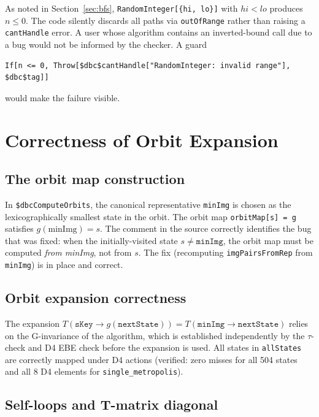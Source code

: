 \documentclass[12pt,a4paper]{article}
\theoremstyle{critical}
\theoremstyle{remark}
\theoremstyle{verified}
\begin{document}
As noted in Section~\ref{sec:bfs}, \texttt{RandomInteger[\{hi, lo\}]} with
$hi < lo$ produces $n \leq 0$.  The code silently discards all paths via
\texttt{outOfRange} rather than raising a \texttt{cantHandle} error.  A user
whose algorithm contains an inverted-bound call due to a bug would not be informed
by the checker.  A guard
\begin{lstlisting}
If[n <= 0, Throw[$dbc$cantHandle["RandomInteger: invalid range"], $dbc$tag]]
\end{lstlisting}
would make the failure visible.

\section{Correctness of Orbit Expansion}
\label{sec:orbits}

\subsection{The orbit map construction}

In \texttt{\$dbcComputeOrbits}, the canonical representative \texttt{minImg} is
chosen as the lexicographically smallest state in the orbit.  The orbit map
\texttt{orbitMap[s] = g} satisfies $g(\text{minImg}) = s$.  The comment in the
source correctly identifies the bug that was fixed: when the initially-visited
state $s \neq \texttt{minImg}$, the orbit map must be computed \emph{from
minImg}, not from $s$.  The fix (recomputing \texttt{imgPairsFromRep} from
\texttt{minImg}) is in place and correct.

\subsection{Orbit expansion correctness}

The expansion $T(\texttt{sKey} \to g(\texttt{nextState})) = T(\texttt{minImg} \to \texttt{nextState})$ relies on
the G-invariance of the algorithm, which is established independently by the
$\tau$-check and D4 EBE check before the expansion is used.  All states in
\texttt{allStates} are correctly mapped under D4 actions (verified: zero misses
for all 504 states and all 8 D4 elements for \texttt{single\_metropolis}).

\subsection{Self-loops and T-matrix diagonal}
\end{document}
